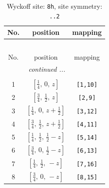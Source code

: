 \documentclass[fleqn,8pt]{jsarticle}
\begin{document}
\begin{longtable}{ccc}
\caption{Wyckoff site: {\tt 8h}, site symmetry: {\tt ..2}}
 \\
 \hline \hline
No. & position & mapping \\ \hline \endfirsthead

\multicolumn{2}{l}{\tablename\ \thetable{}} \\
 \hline \hline
No. & position & mapping \\ \hline \endhead

 \hline \hline
\multicolumn{2}{r}{\footnotesize\it continued ...} \\ \endfoot

 \hline \hline
\multicolumn{2}{r}{} \\ \endlastfoot

1 & $\left[ \frac{1}{4},\, 0,\, z \right]$ & {\tt [1,10]} \\ \hline
2 & $\left[ \frac{3}{4},\, \frac{1}{2},\, z \right]$ & {\tt [2,9]} \\ \hline
3 & $\left[ \frac{1}{4},\, 0,\, z + \frac{1}{2} \right]$ & {\tt [3,12]} \\ \hline
4 & $\left[ \frac{3}{4},\, \frac{1}{2},\, z + \frac{1}{2} \right]$ & {\tt [4,11]} \\ \hline
5 & $\left[ \frac{1}{4},\, \frac{1}{2},\, \frac{1}{2} - z \right]$ & {\tt [5,14]} \\ \hline
6 & $\left[ \frac{3}{4},\, 0,\, \frac{1}{2} - z \right]$ & {\tt [6,13]} \\ \hline
7 & $\left[ \frac{1}{4},\, \frac{1}{2},\, - z \right]$ & {\tt [7,16]} \\ \hline
8 & $\left[ \frac{3}{4},\, 0,\, - z \right]$ & {\tt [8,15]} \\
\end{longtable}
\renewcommand{\arraystretch}{1.2}
\end{document}
